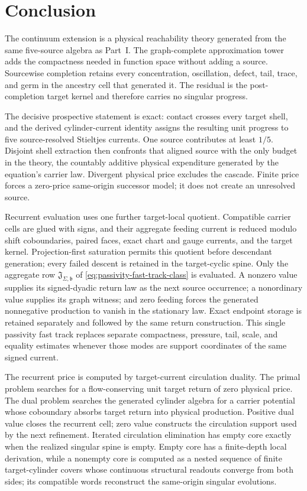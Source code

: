 \documentclass[11pt]{article}
\numberwithin{section}{part}
\theoremstyle{plain}
\theoremstyle{definition}
\theoremstyle{remark}
\begin{document}
\section{Conclusion}

The continuum extension is a physical reachability theory generated from the
same five-source algebra as Part~I.  The graph-complete approximation tower
adds the compactness needed in function space without adding a source.
Sourcewise completion retains every concentration, oscillation, defect, tail,
trace, and germ in the ancestry cell that generated it.  The residual is the
post-completion target kernel and therefore carries no singular progress.

The decisive prospective statement is exact: contact crosses every target
shell, and the derived cylinder-current identity assigns the resulting unit
progress to five source-resolved Stieltjes currents.  One source contributes
at least \(1/5\).  Disjoint shell extraction then confronts that aligned
source with the only budget in the theory, the countably additive physical
expenditure generated by the equation's carrier law.  Divergent physical
price excludes the cascade.  Finite price forces a zero-price same-origin
successor model; it does not create an unresolved source.

Recurrent evaluation uses one further target-local quotient.  Compatible
carrier cells are glued with signs, and their aggregate feeding current is
reduced modulo shift coboundaries, paired faces, exact chart and gauge
currents, and the target kernel.  Projection-first saturation permits this
quotient before descendant generation; every failed descent is retained in
the target-cyclic spine.  Only the aggregate row
\(\mathfrak J_{\Sigma,\mathfrak b}\) of
\eqref{eq:passivity-fast-track-class} is evaluated.  A nonzero value supplies
its signed-dyadic return law as the next source occurrence; a nonordinary
value supplies its graph witness; and zero feeding forces the generated
nonnegative production to vanish in the stationary law.  Exact endpoint
storage is retained separately and followed by the same return construction.
This single passivity fast track replaces separate compactness, pressure,
tail, scale, and equality estimates whenever those modes are support
coordinates of the same signed current.

The recurrent price is computed by target-current circulation duality.  The
primal problem searches for a flow-conserving unit target return of zero
physical price.  The dual problem searches the generated cylinder algebra for
a carrier potential whose coboundary absorbs target return into physical
production.  Positive dual value closes the recurrent cell; zero value
constructs the circulation support used by the next refinement.  Iterated
circulation elimination has empty core exactly when the realized singular
spine is empty.  Empty core has a finite-depth local derivation, while a
nonempty core is computed as a nested sequence of finite target-cylinder
covers whose continuous structural readouts converge from both sides; its
compatible words reconstruct the same-origin singular evolutions.
\end{document}
